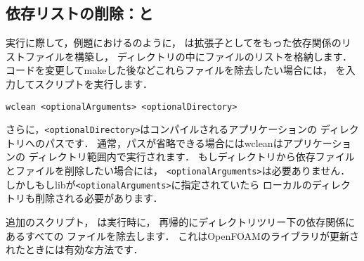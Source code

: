 \subsection{依存リストの削除：と}
\label{ssec:3.2.3}
実行に際して，例題におけるのように，
は拡張子としてをもった依存関係のリストファイルを構築し，
ディレクトリの中にファイルのリストを格納します．
コードを変更してmakeした後などこれらファイルを除去したい場合には，
%
%
を入力してスクリプトを実行します．
\begin{OFterminal}
\begin{verbatim}
wclean <optionalArguments> <optionalDirectory>
\end{verbatim}
\end{OFterminal}
さらに，\verb|<optionalDirectory>|はコンパイルされるアプリケーションの
ディレクトリへのパスです．
通常，パスが省略できる場合にはwcleanはアプリケーションの
ディレクトリ範囲内で実行されます．
もしディレクトリから依存ファイルとファイルを削除したい場合には，
\verb|<optionalArguments>|は必要ありません．
しかしもしlibが\verb|<optionalArguments>|に指定されていたら
ローカルのディレクトリも削除される必要があります．

追加のスクリプト，
%
%
は実行時に，
再帰的にディレクトリツリー下の依存関係にあるすべての
ファイルを除去します．
これはOpenFOAMのライブラリが更新されたときには有効な方法です．


